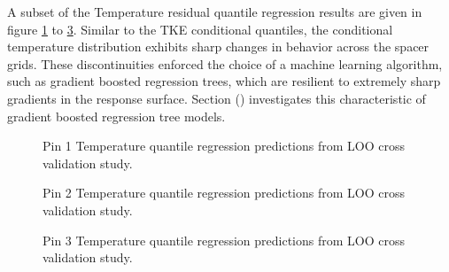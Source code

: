 A subset of the Temperature residual quantile regression results are given in figure \ref{fig:temppin1} to \ref{fig:temppin3}.  Similar to the TKE conditional quantiles, the conditional temperature distribution exhibits sharp changes in behavior across the spacer grids.  These discontinuities enforced the choice of a machine learning algorithm, such as gradient boosted regression trees, which are resilient to extremely sharp gradients in the response surface.  Section () investigates this characteristic of gradient boosted regression tree models.

\begin{figure}[H]%
    \centering
    \qquad
    \caption[Q-Q LOO Temperature pin 1 results.]{Pin 1 Temperature quantile regression predictions from LOO cross validation study.}%
    \label{fig:temppin1}%
\end{figure}

\begin{figure}[H]%
    \centering
    \qquad
    \caption[Q-Q LOO Temperature pin 2 results.]{Pin 2 Temperature quantile regression predictions from LOO cross validation study.}%
    \label{fig:temppin2}%
\end{figure}

\begin{figure}[H]%
    \centering
    \qquad
    \caption[Q-Q LOO Temperature pin 3 results.]{Pin 3 Temperature quantile regression predictions from LOO cross validation study.}%
    \label{fig:temppin3}%
\end{figure}

